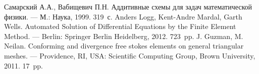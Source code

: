 \documentclass[12pt]{article}
\begin{document}
\begin{thebibliography}{9}
 Самарский А.А., Вабищевич П.Н. Аддитивные схемы для задач математической физики. \newblock --- М.: Наука, 1999. 319~с.
 Anders Logg, Kent-Andre Mardal, Garth Wells. Automated Solution of Differential Equations by the Finite Element Method. \newblock --- Berlin: Springer Berlin Heidelberg, 2012. 723~pp.
 J. Guzman, M. Neilan. Conforming and divergence free stokes elements on general triangular meshes. \newblock --- Providence, RI, USA: Scientific Computing Group, Brown University, 2011. 17~pp.


\end{thebibliography}
\end{document}
